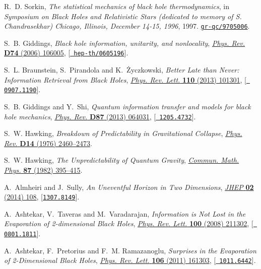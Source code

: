 \documentclass[10pt]{article}
\begin{document}
\begin{thebibliography}{100}
R.~D. Sorkin, \emph{{The statistical mechanics of black hole thermodynamics}},
  in \emph{{Symposium on Black Holes and Relativistic Stars (dedicated to
  memory of S. Chandrasekhar) Chicago, Illinois, December 14-15, 1996}}, 1997.
\newblock \href{http://arxiv.org/abs/gr-qc/9705006}{{\tt gr-qc/9705006}}.

S.~B. Giddings, \emph{{Black hole information, unitarity, and nonlocality}},
  \href{http://dx.doi.org/10.1103/PhysRevD.74.106005}{\emph{Phys. Rev.} {\bf
  D74} (2006) 106005}, [\href{http://arxiv.org/abs/hep-th/0605196}{{\tt
  hep-th/0605196}}].

S.~L. Braunstein, S.~Pirandola and K.~Życzkowski, \emph{{Better Late than
  Never: Information Retrieval from Black Holes}},
  \href{http://dx.doi.org/10.1103/PhysRevLett.110.101301}{\emph{Phys. Rev.
  Lett.} {\bf 110} (2013) 101301}, [\href{http://arxiv.org/abs/0907.1190}{{\tt
  0907.1190}}].

S.~B. Giddings and Y.~Shi, \emph{{Quantum information transfer and models for
  black hole mechanics}},
  \href{http://dx.doi.org/10.1103/PhysRevD.87.064031}{\emph{Phys. Rev.} {\bf
  D87} (2013) 064031}, [\href{http://arxiv.org/abs/1205.4732}{{\tt
  1205.4732}}].

S.~W. Hawking, \emph{{Breakdown of Predictability in Gravitational Collapse}},
  \href{http://dx.doi.org/10.1103/PhysRevD.14.2460}{\emph{Phys. Rev.} {\bf D14}
  (1976) 2460--2473}.

S.~W. Hawking, \emph{{The Unpredictability of Quantum Gravity}},
  \href{http://dx.doi.org/10.1007/BF01206031}{\emph{Commun. Math. Phys.} {\bf
  87} (1982) 395--415}.

A.~Almheiri and J.~Sully, \emph{{An Uneventful Horizon in Two Dimensions}},
  \href{http://dx.doi.org/10.1007/JHEP02(2014)108}{\emph{JHEP} {\bf 02} (2014)
  108}, [\href{http://arxiv.org/abs/1307.8149}{{\tt 1307.8149}}].

A.~Ashtekar, V.~Taveras and M.~Varadarajan, \emph{{Information is Not Lost in
  the Evaporation of 2-dimensional Black Holes}},
  \href{http://dx.doi.org/10.1103/PhysRevLett.100.211302}{\emph{Phys. Rev.
  Lett.} {\bf 100} (2008) 211302}, [\href{http://arxiv.org/abs/0801.1811}{{\tt
  0801.1811}}].

A.~Ashtekar, F.~Pretorius and F.~M. Ramazanoglu, \emph{{Surprises in the
  Evaporation of 2-Dimensional Black Holes}},
  \href{http://dx.doi.org/10.1103/PhysRevLett.106.161303}{\emph{Phys. Rev.
  Lett.} {\bf 106} (2011) 161303}, [\href{http://arxiv.org/abs/1011.6442}{{\tt
  1011.6442}}].


\end{thebibliography}
\end{document}
